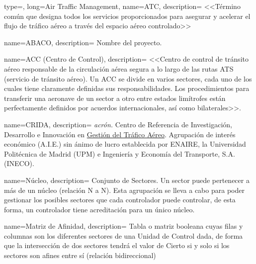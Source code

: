 \makeglossaries

%
%
%        
%
%


{
    type=\acronymtype, %
    long={Air Traffic Management}, %
    name={ATC}, 
    description=
    {
       <<Término común que designa todos los servicios proporcionados para asegurar y acelerar el flujo de tráfico 
       aéreo a través del espacio aéreo controlado>>~\cite{ENAIRE-web}
    }
}

{
    name={ABACO},
    description=
    {   
        Nombre del proyecto.
    }
}

{
    name={ACC (Centro de Control)},
    description=
    {
        <<Centro de control de tránsito aéreo responsable de la circulación aérea segura a lo largo de las rutas ATS 
        (servicio de tránsito aéreo). Un ACC se divide en varios sectores, cada uno de los cuales tiene claramente 
        definidas sus responsabilidades. Los procedimientos para transferir una aeronave de un sector a otro entre 
        estados limítrofes están perfectamente definidos por acuerdos internacionales, así como 
        bilaterales>>. \cite{ENAIRE-web}
    }
}

{
    name={CRIDA},
    description=
    {   
        \textit{acrón.} Centro de Referencia de Investigación, Desarrollo e Innovación 
        en \hyperref[ATC]{Gestión del Tráfico Aéreo}. Agrupación de interés económico (A.I.E.) sin ánimo de lucro 
        establecida por ENAIRE, la Universidad Politécnica de Madrid (UPM) e Ingeniería y Economía del Transporte, S.A. 
        (INECO).~\cite{CRIDA-web}
    }
}

{
    name={Núcleo},
    description=
    {   
        Conjunto de Sectores. Un sector puede pertenecer a más de un núcleo (relación N a N). Esta 
        agrupación se lleva a cabo para poder gestionar los posibles sectores que cada controlador puede controlar, de 
        esta 
        forma, un controlador tiene acreditación para un único núcleo.
    }
}

{
    name={Matriz de Afinidad},
    description=
    {   
        Tabla o matriz booleana cuyas filas y columnas son los diferentes sectores de 
        una Unidad de Control dada, de forma que la intersección de dos sectores tendrá el valor de Cierto si y solo si 
        los sectores son afines entre sí (relación bidireccional)
    }
}

